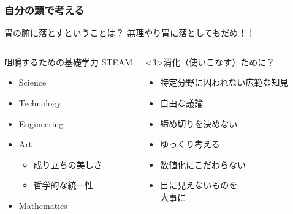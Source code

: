 \documentclass[12pt, dvipdfmx]{beamer}
\begin{document}
\begin{frame}
    \frametitle{自分の頭で考える}
        \begin{alertblock}{胃の腑に落とすということは？}
            無理やり胃に落としてもだめ！！

            \begin{columns}[T, onlytextwidth]
                
                \begin{block}{咀嚼するための基礎学力}
                    STEAM 
                    \begin{itemize}
                        \item Science
                        \item Technology
                        \item Engineering
                        \item \alert{Art}
                        \begin{itemize}
                            \item<2-> 成り立ちの美しさ
                            \item<2-> 哲学的な統一性 
                        \end{itemize}
                        \item Mathematics
                    \end{itemize}
                \end{block}
                \begin{exampleblock}<3>{消化（使いこなす）ために？}
                    \begin{itemize}
                        \item 特定分野に囚われない広範な知見
                        \item 自由な議論
                        \item 締め切りを決めない
                        \item ゆっくり考える
                        \item 数値化にこだわらない
                        \item 目に見えないものを\\大事に
                    \end{itemize}
                \end{exampleblock}
            \end{columns}
        \end{alertblock}
\end{frame}
\end{document}
